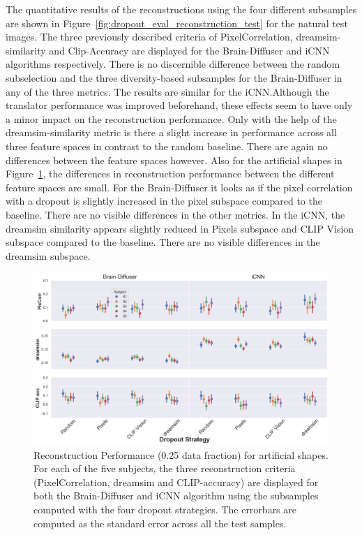The quantitative results of the reconstructions using the four different subsamples are shown in Figure~\ref{fig:dropout_eval_reconstruction_test} for the natural test images. The three previously described criteria of PixelCorrelation, dreamsim-similarity and Clip-Accuracy are displayed for the Brain-Diffuser and iCNN algorithms respectively. There is no discernible difference between the random subselection and the three diversity-based subsamples for the Brain-Diffuser in any of the three metrics. The results are similar for the iCNN.\@ Although the translator performance was improved beforehand, these effects seem to have only a minor impact on the reconstruction performance. Only with the help of the dreamsim-similarity metric is there a slight increase in performance across all three feature spaces in contrast to the random baseline. There are again no differences between the feature spaces however. Also for the artificial shapes in Figure~\ref{fig:dropout_eval_reconstruction_art}, the differences in reconstruction performance between the different feature spaces are small. For the Brain-Diffuser it looks as if the pixel correlation with a dropout is slightly increased in the pixel subspace compared to the baseline. There are no visible differences in the other metrics. In the iCNN, the dreamsim similarity appears slightly reduced in Pixels subspace and CLIP Vision subspace compared to the baseline. There are no visible differences in the dreamsim subspace.

\begin{figure}[ht]
  \centering
  \includegraphics[width=1\textwidth]{plots/dropout_eval_reconstruction_art.png}
  \caption[Experiment 1: Reconstruction performance for artificial shapes]{Reconstruction Performance (0.25 data fraction) for artificial shapes. For each of the five subjects, the three reconstruction criteria (PixelCorrelation, dreamsim and CLIP-accuracy) are displayed for both the Brain-Diffuser and iCNN algorithm using the subsamples computed with the four dropout strategies. The errorbars are computed as the standard error across all the test samples.}\label{fig:dropout_eval_reconstruction_art}
\end{figure}


